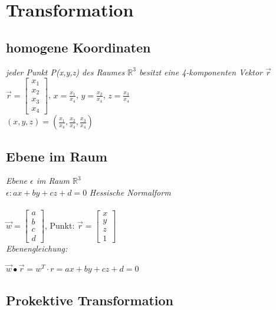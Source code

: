 \section{Transformation}

\subsection{homogene Koordinaten}

\textit{jeder Punkt P(x,y,z) des Raumes $\mathbb{R}^3$ besitzt eine 4-komponenten Vektor $\vec{r}$}
\\
$\vec{r} = \begin{bmatrix}
    x_1 \\
    x_2 \\
    x_3 \\
    x_4
\end{bmatrix}$,
$x = \frac{x_1}{x_4}$,
$y = \frac{x_2}{x_4}$,
$z = \frac{x_3}{x_4}$ \\

$(x,y,z) = (\frac{x_1}{x_4}, \frac{x_2}{x_4}, \frac{x_3}{x_4})$

\subsection{Ebene im Raum}

\textit{Ebene $\epsilon$ im Raum $\mathbb{R}^3$}
\\
$\epsilon : ax + by + cz + d = 0$
\textit{Hessische Normalform}
\\ \\
$\vec{w} = \begin{bmatrix}
    a \\
    b \\
    c \\
    d
\end{bmatrix}$, Punkt:
$\vec{r} = \begin{bmatrix}
    x \\
    y \\
    z \\
    1
\end{bmatrix}$ \\

\textit{Ebenengleichung:}

$\vec{w} \bullet \vec{r} = w^T \cdot r = ax + by + cz + d = 0$ \\

\subsection{Prokektive Transformation}


